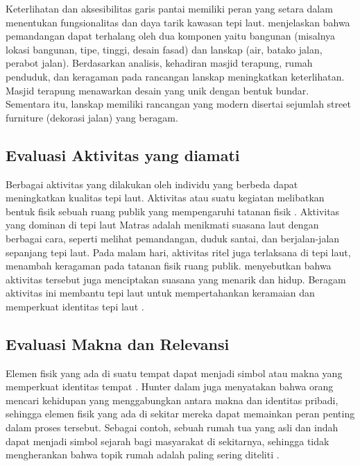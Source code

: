 \documentclass[11pt]{simart} %
\begin{document}
Keterlihatan dan aksesibilitas garis pantai memiliki peran yang setara dalam menentukan fungsionalitas dan daya tarik kawasan tepi laut.
\cite{wanismail2018} menjelaskan bahwa pemandangan dapat terhalang oleh dua komponen yaitu bangunan (misalnya lokasi bangunan, tipe, tinggi, desain fasad) dan lanskap (air, batako jalan, perabot jalan). Berdasarkan analisis, kehadiran masjid terapung, rumah penduduk, dan keragaman pada rancangan lanskap meningkatkan keterlihatan. Masjid terapung menawarkan desain yang unik dengan bentuk bundar. Sementara itu, lanskap memiliki rancangan yang modern disertai sejumlah street furniture (dekorasi jalan) yang beragam.

\subsection{Evaluasi Aktivitas yang diamati}%
\label{sub:Evaluasi Aktivitas yang diamati}

Berbagai aktivitas yang dilakukan oleh individu yang berbeda dapat meningkatkan kualitas tepi laut. Aktivitas atau suatu kegiatan melibatkan bentuk fisik sebuah ruang publik yang mempengaruhi tatanan fisik \citep{wanismail2018}. Aktivitas yang dominan di tepi laut Matras adalah menikmati suasana laut dengan berbagai cara, seperti melihat pemandangan, duduk santai, dan berjalan-jalan sepanjang tepi laut. Pada malam hari, aktivitas ritel juga terlaksana di tepi laut, menambah keragaman pada tatanan fisik ruang publik. \cite{wanismail2018} menyebutkan bahwa aktivitas tersebut juga menciptakan suasana yang menarik dan hidup. Beragam aktivitas ini membantu tepi laut untuk mempertahankan keramaian dan memperkuat identitas tepi laut \citep{iqbal2020}.

\subsection{Evaluasi Makna dan Relevansi}%
\label{sub:Evaluasi Makna dan Relevansi}

Elemen fisik yang ada di suatu tempat dapat menjadi simbol atau makna yang memperkuat identitas tempat \citep{hull1994}. Hunter dalam \cite{hull1994}  juga menyatakan bahwa orang mencari kehidupan yang menggabungkan antara makna dan identitas pribadi, sehingga elemen fisik yang ada di sekitar mereka dapat memainkan peran penting dalam proses tersebut.
Sebagai contoh, sebuah rumah tua yang asli dan indah dapat menjadi simbol sejarah bagi masyarakat di sekitarnya, sehingga tidak mengherankan bahwa topik rumah adalah paling sering diteliti \citep{hull1994}.
\end{document}
